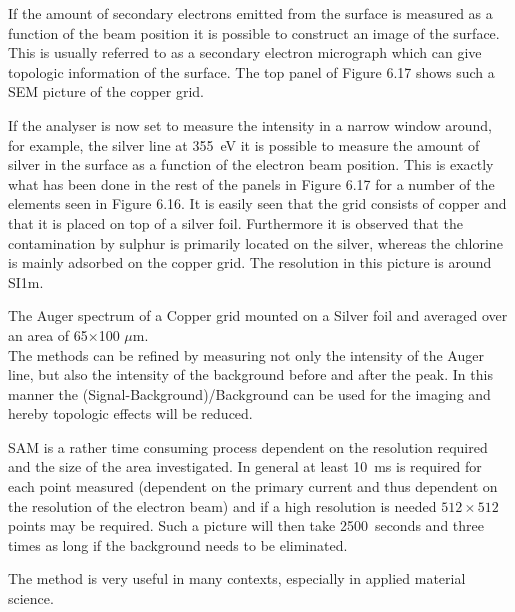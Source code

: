 If the amount of secondary electrons emitted  from the surface is measured as a function of the beam position it is possible to construct an image of the surface. This is usually referred to as a secondary electron micrograph which can give topologic information of the surface. The top panel of Figure 6.17 shows such a SEM picture of the copper grid.

If the analyser is now set to measure the intensity in a narrow window around, for example, the silver line at \SI{355}{\electronvolt} it is possible to measure the amount of silver in the surface as a function of the electron beam position. This is exactly what has been done in the rest of the panels in Figure 6.17 for a number of the elements seen in Figure 6.16. It is easily seen that the grid consists of copper and that it is placed on top of a silver foil. Furthermore it is observed that the contamination by sulphur is primarily located on the silver, whereas the chlorine is mainly adsorbed on the copper grid. The resolution in this picture is around SI{1}{\micro m}.

  \newpage
          \vspace*{12cm}

          The Auger spectrum of  a  Copper
         grid mounted on a Silver foil and averaged over  an  area  of
         65$\times$100 $\mu$m.\\

The methods can be refined by measuring not only the intensity of the Auger line, but also the intensity of the background before and after the peak. In this manner the (Signal-Background)/Background can be used for the imaging and hereby topologic effects will be reduced.

SAM is a rather time consuming process dependent on the resolution required and the size of the area investigated. In general at least \SI{10}{ms} is required for each point measured (dependent on the primary current and thus dependent on the resolution of the electron beam) and if a high resolution is needed $512\times512$ points may be required. Such a picture will then take \SI{2500}{seconds} and three times as long if the background needs to be eliminated.

The method is very useful in many contexts, especially in applied material science.\\
          \newpage

          \vspace*{18cm}

